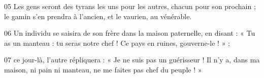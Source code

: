 
05 Les gens seront des tyrans les uns pour les autres, chacun pour son prochain ; le gamin s’en prendra à l’ancien, et le vaurien, au vénérable.

06 Un individu se saisira de son frère dans la maison paternelle, en disant : « Tu as un manteau : tu seras notre chef ! Ce pays en ruines, gouverne-le ! » ;

07 ce jour-là, l’autre répliquera : « Je ne suis pas un guérisseur ! Il n’y a, dans ma maison, ni pain ni manteau, ne me faites pas chef du peuple ! »
